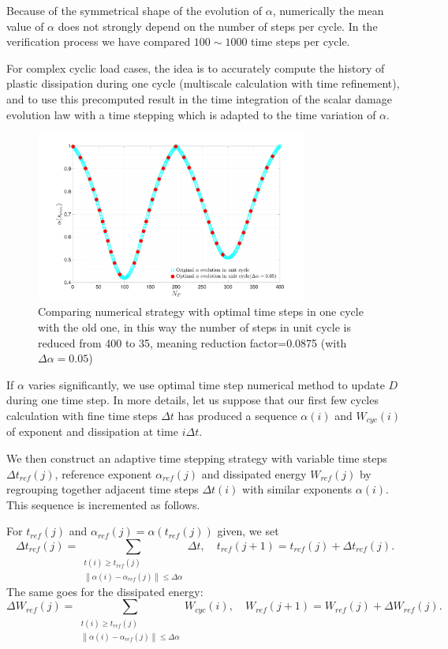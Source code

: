 \documentclass[3p,times,number,review]{elsarticle}
\begin{document}
Because of the symmetrical shape of the evolution of $\alpha$, numerically the mean value of $\alpha$ does not strongly depend on the number of steps per cycle. In the verification process we have compared $100\sim1000$ time steps per cycle. 

For complex cyclic load cases, the idea is to accurately compute the history of plastic dissipation during one cycle (multiscale calculation with time refinement), and to use this precomputed result in the time integration of the scalar damage evolution law with a time stepping which is adapted to the time variation of $\alpha$. 

\begin{figure}[!h]
	\centering
	\includegraphics[width=0.8\textwidth]{figures//alpha_opt_vs_alpha_stepnumber.png} 
	\caption{Comparing numerical strategy with optimal time steps in one cycle with the old one, in this way the number of steps in unit cycle is reduced from 400 to 35, meaning reduction factor=0.0875 (with $\Delta\alpha=0.05$)}
	\label{fig.alpha_opt_vs_alpha_stepnumber}
\end{figure}

If $\alpha$ varies significantly, we use optimal time step numerical method to update $D$ during one time step. In more details, let us suppose that our first few cycles calculation with fine time steps $\Delta t$ has produced a sequence $\alpha(i)$ and $W_{cyc}(i)$ of exponent and dissipation at time $i\Delta t$.

We then construct an adaptive time stepping strategy with variable time steps $\Delta t_{ref}(j)$, reference exponent $\alpha_{ref}(j)$ and dissipated energy $W_{ref}(j)$ by regrouping together adjacent time steps $\Delta t(i)$ with similar exponents $\alpha(i)$. This sequence is incremented as follows.


For $t_{ref}(j)$ and $\alpha_{ref}(j)=\alpha(t_{ref}(j))$ given, we set
$$\Delta t_{ref}(j)=\sum_{\substack{t(i)\geqslant t_{ref}(j)\\\left\| \alpha(i)-\alpha_{ref}(j)\right\|\leqslant \Delta\alpha }}\Delta t, \quad t_{ref}(j+1)=t_{ref}(j)+\Delta t_{ref}(j).$$
The same goes for the dissipated energy:
$$\Delta W_{ref}(j)=\sum_{\substack{t(i)\geqslant t_{ref}(j)\\\left\| \alpha(i)-\alpha_{ref}(j)\right\|\leqslant \Delta\alpha} }W_{cyc}(i) , \quad W_{ref}(j+1)=W_{ref}(j)+\Delta W_{ref}(j).$$
\end{document}
